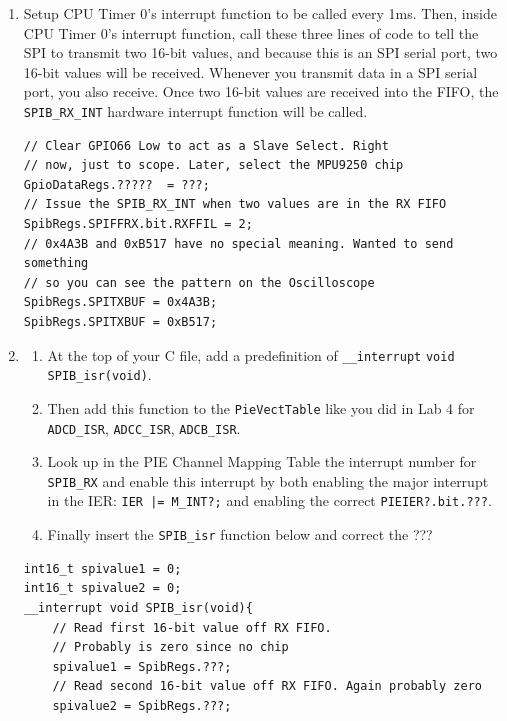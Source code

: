 \documentclass[11pt]{article}
\begin{document}
\begin{enumerate}
\begin{verbatim}
// Interrupt Level to 16 words or more received into
// FIFO causes an interrupt. This is just the initial
// setting for the register. Will be changed below
SpibRegs.SPIFFRX.bit.RXFFIL =???;
\end{verbatim}
        \item Setup CPU Timer 0’s interrupt function to be called every 1ms. Then, inside CPU Timer 0’s interrupt function, call these three lines of code to tell the SPI to transmit two 16-bit values, and because this is an SPI serial port, two 16-bit values will be received. Whenever you transmit data in a SPI serial port, you also receive. Once two 16-bit values are received into the FIFO, the \texttt{SPIB_RX_INT} hardware interrupt function will be called.
\begin{verbatim}
// Clear GPIO66 Low to act as a Slave Select. Right
// now, just to scope. Later, select the MPU9250 chip
GpioDataRegs.?????  = ???;
// Issue the SPIB_RX_INT when two values are in the RX FIFO
SpibRegs.SPIFFRX.bit.RXFFIL = 2;
// 0x4A3B and 0xB517 have no special meaning. Wanted to send something
// so you can see the pattern on the Oscilloscope
SpibRegs.SPITXBUF = 0x4A3B;
SpibRegs.SPITXBUF = 0xB517;
\end{verbatim}
    \item
        \begin{enumerate}
                \item At the top of your C file, add a predefinition of \texttt{__interrupt} \texttt{void} \texttt{SPIB_isr(void)}.
                \item Then add this function to the \texttt{PieVectTable} like you did in Lab 4 for \texttt{ADCD_ISR}, \texttt{ADCC_ISR}, \texttt{ADCB_ISR}.
                \item Look up in the PIE Channel Mapping Table the interrupt number for \texttt{SPIB_RX} and enable this interrupt by both enabling the major interrupt in the IER: \texttt{IER |= M_INT?;} and enabling the correct \texttt{PIEIER?.bit.???}.
                \item Finally insert the \texttt{SPIB_isr} function below and correct the ???
        \end{enumerate}
\begin{verbatim}
int16_t spivalue1 = 0;
int16_t spivalue2 = 0;
__interrupt void SPIB_isr(void){
    // Read first 16-bit value off RX FIFO.
    // Probably is zero since no chip
    spivalue1 = SpibRegs.???;
    // Read second 16-bit value off RX FIFO. Again probably zero
    spivalue2 = SpibRegs.???;


\end{verbatim}
\end{enumerate}
\end{document}

